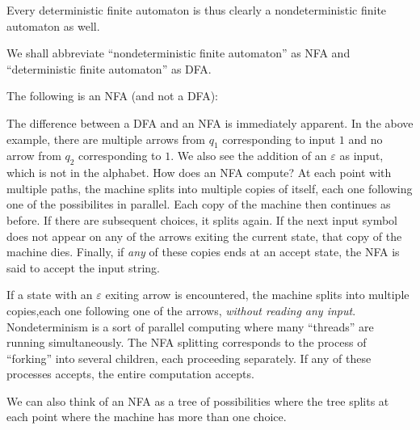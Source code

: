 Every deterministic finite automaton is thus clearly a nondeterministic finite automaton as well.

We shall abbreviate ``nondeterministic finite automaton'' as NFA and ``deterministic finite automaton'' as DFA.

\begin{example}
The following is an NFA (and not a DFA):
\begin{center}
\end{center}
\end{example}

The difference between a DFA and an NFA is immediately apparent. In the above example, there are multiple arrows from $q_1$ corresponding to input $1$ and no arrow from $q_2$ corresponding to $1$. We also see the addition of an $\varepsilon$ as input, which is not in the alphabet.
\vspace{3mm}
How does an NFA compute? At each point with multiple paths, the machine splits into multiple copies of itself, each one following one of the possibilites in parallel. Each copy of the machine then continues as before. If there are subsequent choices, it splits again. If the next input symbol does not appear on any of the arrows exiting the current state, that copy of the machine dies. Finally, if \textit{any} of these copies ends at an accept state, the NFA is said to accept the input string.

If a state with an $\varepsilon$ exiting arrow is encountered, the machine splits into multiple copies,each one following one of the arrows, \textit{without reading any input}.
\vspace{3mm}
Nondeterminism is a sort of parallel computing where many ``threads'' are running simultaneously. The NFA splitting corresponds to the process of ``forking'' into several children, each proceeding separately. If any of these processes accepts, the entire computation accepts.

We can also think of an NFA as a tree of possibilities where the tree splits at each point where the machine has more than one choice.
\vspace{3mm}


